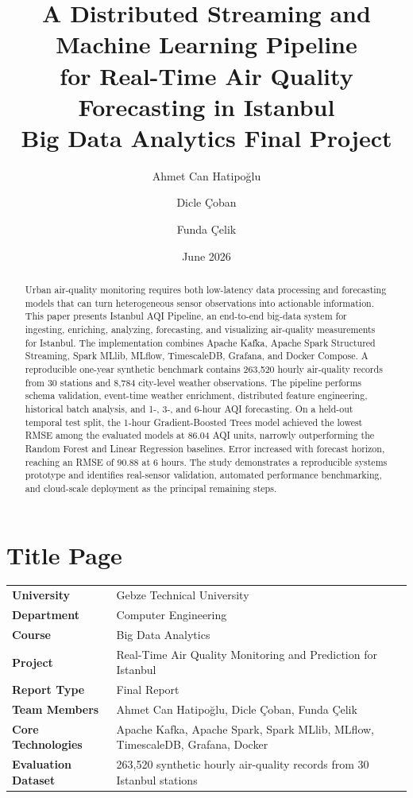 \documentclass[12pt,a4paper]{article}
\title{\textbf{A Distributed Streaming and Machine Learning Pipeline}\\
for Real-Time Air Quality Forecasting in Istanbul\\[0.5em]
\large Big Data Analytics Final Project}
\author{Ahmet Can Hatipoğlu \and Dicle Çoban \and Funda Çelik}
\date{June 2026}
\newcommand{\system}{Istanbul AQI Pipeline}
\begin{document}
\maketitle
\thispagestyle{empty}

\section*{Title Page}

\begin{tabularx}{\textwidth}{>{\bfseries}l X}
University & Gebze Technical University \\
Department & Computer Engineering \\
Course & Big Data Analytics \\
Project & Real-Time Air Quality Monitoring and Prediction for Istanbul \\
Report Type & Final Report \\
Team Members & Ahmet Can Hatipoğlu, Dicle Çoban, Funda Çelik \\
Core Technologies & Apache Kafka, Apache Spark, Spark MLlib, MLflow, TimescaleDB, Grafana, Docker \\
Evaluation Dataset & 263,520 synthetic hourly air-quality records from 30 Istanbul stations \\
\end{tabularx}

\newpage
\tableofcontents
\newpage

\begin{abstract}
Urban air-quality monitoring requires both low-latency data processing and
forecasting models that can turn heterogeneous sensor observations into
actionable information. This paper presents \system, an end-to-end big-data
system for ingesting, enriching, analyzing, forecasting, and visualizing
air-quality measurements for Istanbul. The implementation combines Apache
Kafka, Apache Spark Structured Streaming, Spark MLlib, MLflow, TimescaleDB,
Grafana, and Docker Compose. A reproducible one-year synthetic benchmark
contains 263,520 hourly air-quality records from 30 stations and 8,784
city-level weather observations. The pipeline performs schema validation,
event-time weather enrichment, distributed feature engineering, historical
batch analysis, and 1-, 3-, and 6-hour AQI forecasting. On a held-out temporal
test split, the 1-hour Gradient-Boosted Trees model achieved the lowest RMSE
among the evaluated models at 86.04 AQI units, narrowly outperforming the
Random Forest and Linear Regression baselines. Error increased with forecast
horizon, reaching an RMSE of 90.88 at 6 hours. The study demonstrates a reproducible systems
prototype and identifies real-sensor validation, automated performance
benchmarking, and cloud-scale deployment as the principal remaining steps.
\end{abstract}
\end{document}
